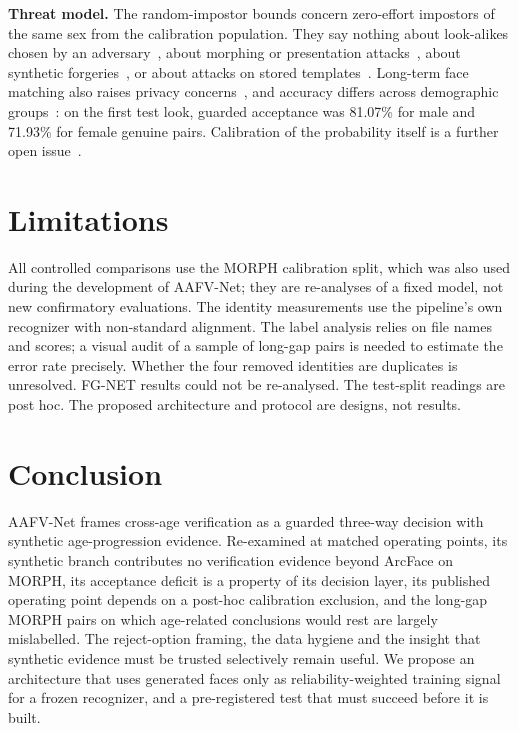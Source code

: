 \documentclass[journal]{IEEEtran}
\begin{document}
\textbf{Threat model.} The random-impostor bounds concern zero-effort impostors of the same sex from the calibration population. They say nothing about look-alikes chosen by an adversary~\cite{hu2025neyman,paone2014twins}, about morphing or presentation attacks~\cite{scherhag2019morph,iso30107_3}, about synthetic forgeries~\cite{zhou2024openset}, or about attacks on stored templates~\cite{otroshi2024inversion}. Long-term face matching also raises privacy concerns~\cite{razeghi2026privacy}, and accuracy differs across demographic groups~\cite{klare2012demographics,grother2019frvt_part3,krishnapriya2020race,buolamwini2018gendershades}: on the first test look, guarded acceptance was 81.07\% for male and 71.93\% for female genuine pairs. Calibration of the probability itself is a further open issue~\cite{guo2017calibration,naeini2015ece,brier1950,xu2024asc}.

\section{Limitations}
All controlled comparisons use the MORPH calibration split, which was also used during the development of AAFV-Net; they are re-analyses of a fixed model, not new confirmatory evaluations. The identity measurements use the pipeline's own recognizer with non-standard alignment. The label analysis relies on file names and scores; a visual audit of a sample of long-gap pairs is needed to estimate the error rate precisely. Whether the four removed identities are duplicates is unresolved. FG-NET results could not be re-analysed. The test-split readings are post hoc. The proposed architecture and protocol are designs, not results.

\section{Conclusion}
AAFV-Net frames cross-age verification as a guarded three-way decision with synthetic age-progression evidence. Re-examined at matched operating points, its synthetic branch contributes no verification evidence beyond ArcFace on MORPH, its acceptance deficit is a property of its decision layer, its published operating point depends on a post-hoc calibration exclusion, and the long-gap MORPH pairs on which age-related conclusions would rest are largely mislabelled. The reject-option framing, the data hygiene and the insight that synthetic evidence must be trusted selectively remain useful. We propose an architecture that uses generated faces only as reliability-weighted training signal for a frozen recognizer, and a pre-registered test that must succeed before it is built.
\end{document}
